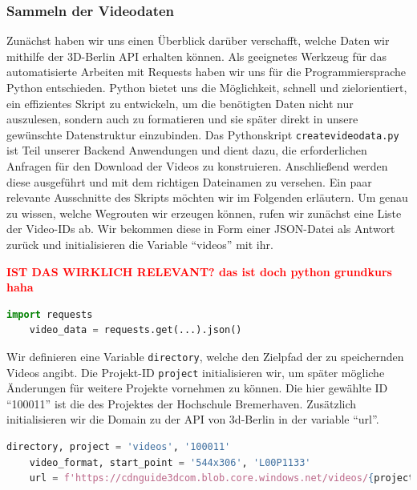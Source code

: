 \subsubsection{Sammeln der Videodaten}

Zunächst haben wir uns einen Überblick darüber verschafft, welche Daten wir mithilfe der 3D-Berlin API erhalten können. Als geeignetes Werkzeug für das automatisierte Arbeiten mit Requests haben wir uns für die Programmiersprache Python entschieden. Python bietet uns die Möglichkeit, schnell und zielorientiert, ein effizientes Skript zu entwickeln, um die benötigten Daten nicht nur auszulesen, sondern auch zu formatieren und sie später direkt in unsere gewünschte Datenstruktur einzubinden. Das Pythonskript \verb|createvideodata.py| ist Teil unserer Backend Anwendungen und dient dazu, die erforderlichen Anfragen für den Download der Videos zu konstruieren. Anschließend werden diese ausgeführt und mit dem richtigen Dateinamen zu versehen. Ein paar relevante Ausschnitte des Skripts möchten wir im Folgenden erläutern.
Um genau zu wissen, welche Wegrouten wir erzeugen können, rufen wir zunächst eine Liste der Video-IDs ab. Wir bekommen diese in Form einer JSON-Datei als Antwort zurück und initialisieren die Variable ``videos'' mit ihr.


\textcolor{red}{\textbf{IST DAS WIRKLICH RELEVANT? das ist doch python grundkurs haha}}
\begin{lstlisting}[language=Python]
    import requests 
    video_data = requests.get(...).json()
\end{lstlisting}

Wir definieren eine Variable \verb|directory|, welche den Zielpfad der zu speichernden Videos angibt. Die Projekt-ID \verb|project| initialisieren wir, um später mögliche Änderungen für weitere Projekte vornehmen zu können. Die hier gewählte ID ``100011'' ist die des Projektes der Hochschule Bremerhaven. Zusätzlich initialisieren wir die Domain zu der API von 3d-Berlin in der variable ``url''.\\

\begin{lstlisting}[language=Python]
    directory, project = 'videos', '100011'
    video_format, start_point = '544x306', 'L00P1133'
    url = f'https://cdnguide3dcom.blob.core.windows.net/videos/{project}'
\end{lstlisting}

